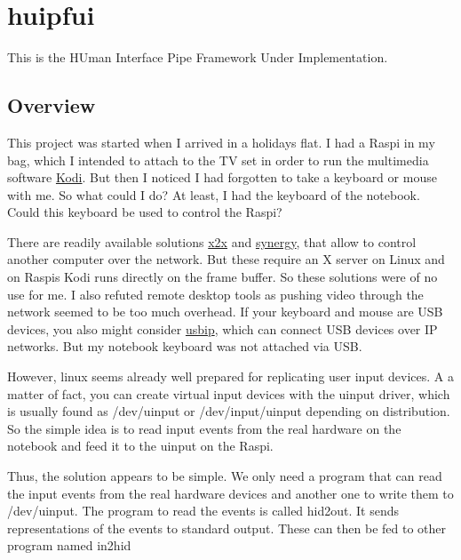 \newenvironment{pdescription}{\begin{list}{}{}\item}{\end{list}}
\newcommand{\pitem}[2]{\par \textbf{#1}#2:}

\section{huipfui}
\label{huipfui}

This is the HUman Interface Pipe Framework Under Implementation.

\subsection{Overview}
This project was started when I arrived in a holidays flat. I had a
Raspi in my bag, which I intended to attach to the TV set in order to run
the multimedia software \href{http://kodi.tv/}{Kodi}. 
But then I noticed I had forgotten to take a keyboard or mouse with me. 
So what could I do? At least, I
had the keyboard of the notebook. Could this keyboard be used to
control the Raspi?

There are readily available solutions 
\href{http://github.com/dottedmag/x2x}{x2x} and 
\href{http://synergy-project.org/}{synergy}, that allow to
control another computer over the network. But these require an X server
on Linux and on Raspis Kodi runs directly on the frame buffer. So these
solutions were of no use for me. I also refuted remote desktop tools as
pushing video through the network seemed to be too much overhead. If your
keyboard and mouse are USB devices, you also might consider 
\href{http://usbip.sourceforge.net/}{usbip}, which
can connect USB devices over IP networks. But my notebook keyboard was
not attached via USB.

However, linux seems already well prepared for replicating 
user input devices. 
A a matter of fact, you can create virtual
input devices with the uinput driver, which is usually found as
/dev/uinput or /dev/input/uinput depending on distribution. So the
simple idea is to read input events from the real hardware on the
notebook and feed it to the uinput on the Raspi.

Thus, the solution appears to be simple.  We only need a program that
can read the input events from the real hardware devices and another
one to write them to /dev/uinput.  The program to read the events is
called hid2out.  It sends representations of the events to standard
output.  These can then be fed to other program named in2hid

